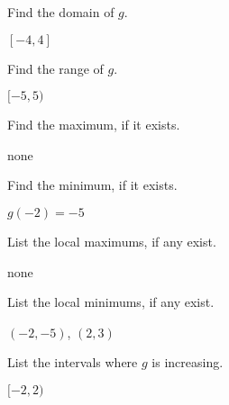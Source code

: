 \documentclass{ximera}
\begin{document}
\begin{problem}\label{usesecondfuncgraphfirst}
Find the domain of $g$.
\begin{solution}
$[-4,4]$
\end{solution}

\end{problem}

\begin{problem}
Find the range of $g$.

\begin{solution}
$[-5,5)$
\end{solution}

\end{problem}

\begin{problem}
Find the maximum, if it exists.
\begin{solution}
none

\end{solution}

\end{problem}

\begin{problem}
Find the minimum, if it exists. 

\begin{solution}
$g(-2) = -5$
\end{solution}

\end{problem}

\begin{problem}
List the local maximums, if any exist.
\begin{solution}
none
\end{solution}

\end{problem}

\begin{problem}
List the local minimums, if any exist.

\begin{solution}
$(-2,-5)$, $(2,3)$

\end{solution}

\end{problem}

\begin{problem}
List the intervals where $g$ is increasing.
\begin{solution}
$[-2,2)$
\end{solution}

\end{problem}
\end{document}
